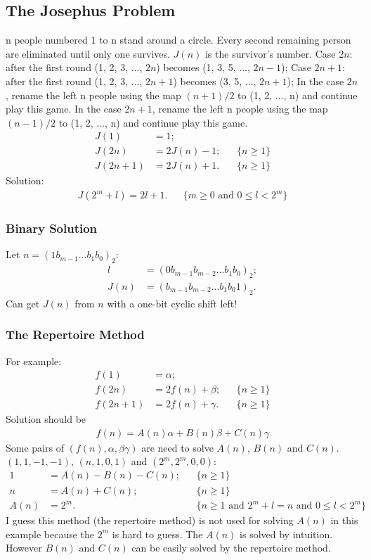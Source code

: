 \documentclass{article}
\begin{document}
\subsection{The Josephus Problem}
n people numbered 1 to n stand around a circle.
Every second remaining person are eliminated until only one survives.
$J(n)$ is the survivor's number.
Case $2n$: after the first round (1, 2, 3, ..., $2n$) becomes (1, 3, 5, ..., $2n-1$);
Case $2n+1$: after the first round (1, 2, 3, ..., $2n+1$) becomes (3, 5, ..., $2n+1$);
In the case $2n$, rename the left n people using the map $(n+1)/2$ to (1, 2, ..., n) and continue play this game.
In the case $2n+1$, rename the left n people using the map $(n-1)/2$ to (1, 2, ..., n) and continue play this game.
\begin{align}
J(1) & = 1;\\
J(2n) & = 2J(n) - 1; && \{n \ge 1\}\\
J(2n+1) & = 2J(n) + 1. && \{n \ge 1\}
\end{align}
Solution:
\begin{align}
J(2^m+l) = 2l+1. && \{m\ge 0 \text{ and } 0 \le l < 2^m\} 
\end{align}

\subsubsection{Binary Solution}
Let $n = (1 b_{m - 1} ... b_1 b_0)_2$:
\begin{align}
l & = (0 b_{m - 1} b_{m - 2} ... b_1 b_0)_2;\\
J(n) & = (b_{m - 1} b_{m - 2} ... b_1 b_0 1)_2.
\end{align}
Can get $J(n)$ from $n$ with a one-bit cyclic shift left!

\subsubsection{The Repertoire Method}
For example:
\begin{align}
f(1) & = \alpha;\\
f(2n) & = 2f(n)+\beta; && \{n\ge 1\}\\
f(2n+1) & = 2f(n)+\gamma. && \{n\ge 1\}
\end{align}
Solution should be
\begin{align}
f(n) = A(n)\alpha + B(n)\beta + C(n)\gamma
\end{align}
Some pairs of $(f(n),\alpha,\beta \gamma)$ are need to solve $A(n)$, $B(n)$ and $C(n)$.\\
$(1,1,-1,-1)$, $(n,1,0,1)$ and $(2^m,2^m,0,0)$:
\begin{align}
1 &= A(n) - B(n) - C(n); && \{n\ge 1\}\\
n &= A(n) + C(n); && \{n\ge 1\}\\
A(n) &= 2^m. && \{n \ge 1 \text{ and } 2^m +l = n \text{ and } 0 \le l < 2^m \}
\end{align}
I guess this method (the repertoire method) is not used for solving $A(n)$ in this example because the $2^m$ is hard to guess.
The $A(n)$ is solved by intuition.
However $B(n)$ and $C(n)$ can be easily solved by the repertoire method.
\end{document}
